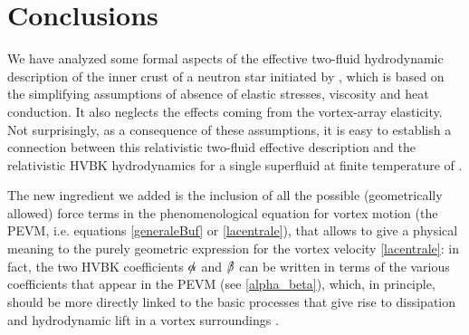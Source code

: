 \documentclass[preprints,article,accept,moreauthors,pdftex]{mdpi}
\newcommand{\spc}{\quad \quad \quad}
\begin{document}

\section{Conclusions}

We have analyzed some formal aspects of the effective two-fluid hydrodynamic description of the inner crust of a neutron star initiated by \citet{langlois98}, which is based on the simplifying assumptions of absence of elastic stresses, viscosity and heat conduction. It also neglects the effects coming from the vortex-array elasticity.
Not surprisingly, as a consequence of these assumptions, it is easy to establish a connection between this relativistic two-fluid effective description and the relativistic HVBK hydrodynamics for a single superfluid at finite temperature of \citet{GusakovHVBK}. 

The new ingredient we added is the inclusion of all the possible (geometrically allowed) force terms in the phenomenological equation for vortex motion (the PEVM, i.e. equations \eqref{generaleBuf} or \eqref{lacentrale}), that allows to give a physical meaning to the purely geometric expression for the vortex velocity \eqref{lacentrale}: in fact, the two HVBK coefficients $\slashed{\alpha}$ and $\slashed{\beta}$ can be written in terms of the various coefficients that appear in the PEVM (see \eqref{alpha_beta}), which, in principle, should be more directly linked to the basic processes that give rise to dissipation and hydrodynamic lift in a vortex surroundings \cite{barenghi1983JLTP}. 
\end{document}
